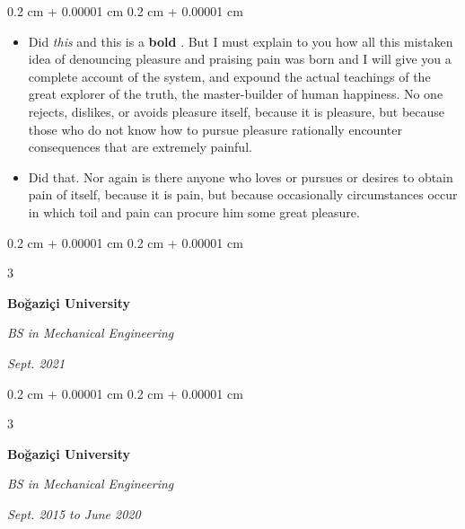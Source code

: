 \documentclass[10pt, letterpaper]{article}
\newenvironment{highlights}{
    \begin{itemize}[
        topsep=0.10 cm,
        parsep=0.10 cm,
        partopsep=0pt,
        itemsep=0pt,
        leftmargin=0.4 cm + 10pt + 0.6 cm
    ]
}{
    \end{itemize}
} %
\newenvironment{onecolentry}{
    \begin{adjustwidth}{
        0.2 cm + 0.00001 cm
    }{
        0.2 cm + 0.00001 cm
    }
}{
    \end{adjustwidth}
} %
\newenvironment{threecolentry}[3][]{
    \onecolentry
    \def\thirdColumn{#3}
    \setcolumnwidth{0.6 cm, \fill, 4.5 cm}
    \begin{paracol}{3}
    #2 \switchcolumn
}{
    \switchcolumn \raggedleft \thirdColumn
    \end{paracol}
    \endonecolentry
} %
\let\hrefWithoutArrow\href
\renewcommand{\href}[2]{\hrefWithoutArrow{#1}{\mbox{\ifthenelse{\equal{#2}{}}{ }{#2 }\raisebox{.15ex}{\footnotesize \faExternalLink*}}}}
\begin{document}
        \vspace{0.10 cm-3px}
        \begin{onecolentry}
            \begin{highlights}
                \item Did \textit{this} and this is a \textbf{bold} \href{https://example.com}{link}. But I must explain to you how all this mistaken idea of denouncing pleasure and praising pain was born and I will give you a complete account of the system, and expound the actual teachings of the great explorer of the truth, the master-builder of human happiness. No one rejects, dislikes, or avoids pleasure itself, because it is pleasure, but because those who do not know how to pursue pleasure rationally encounter consequences that are extremely painful.
                \item Did that. Nor again is there anyone who loves or pursues or desires to obtain pain of itself, because it is pain, but because occasionally circumstances occur in which toil and pain can procure him some great pleasure.
            \end{highlights}
        \end{onecolentry}


        \vspace{0.2 cm-3px}

        \begin{threecolentry}{
            \vspace*{\fill}
            \textbullet
            \vspace*{3px}
            \vspace*{\fill}
        }{
            
            
        \textit{Sept. 2021}}
            \textbf{Boğaziçi University}

            \textit{BS in Mechanical Engineering}
        \end{threecolentry}



        \vspace{0.2 cm-3px}

        \begin{threecolentry}{
            \vspace*{\fill}
            \textbullet
            \vspace*{3px}
            \vspace*{\fill}
        }{
            
            
        \textit{Sept. 2015 to June 2020}}
            \textbf{Boğaziçi University}

            \textit{BS in Mechanical Engineering}
        \end{threecolentry}
\end{document}

